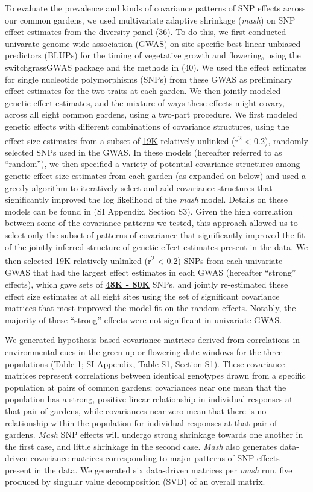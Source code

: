 \documentclass[
  9pt,
  twocolumn,
  twoside]{pnas-new}
\begin{document}
To evaluate the prevalence and kinds of covariance patterns of SNP
effects across our common gardens, we used multivariate adaptive
shrinkage (\emph{mash}) on SNP effect estimates from the diversity panel
(36). To do this, we first conducted univarate genome-wide association
(GWAS) on site-specific best linear unbiased predictors (BLUPs) for the
timing of vegetative growth and flowering, using the switchgrassGWAS
package and the methods in (40). We used the effect estimates for single
nucleotide polymorphisms (SNPs) from these GWAS as preliminary effect
estimates for the two traits at each garden. We then jointly modeled
genetic effect estimates, and the mixture of ways these effects might
covary, across all eight common gardens, using a two-part procedure. We
first modeled genetic effects with different combinations of covariance
structures, using the effect size estimates from a subset of \ul{19K}
relatively unlinked (r\textsuperscript{2} \textless{} 0.2), randomly
selected SNPs used in the GWAS. In these models (hereafter referred to
as ``random''), we then specified a variety of potential covariance
structures among genetic effect size estimates from each garden (as
expanded on below) and used a greedy algorithm to iteratively select and
add covariance structures that significantly improved the log likelihood
of the \emph{mash} model. Details on these models can be found in (SI
Appendix, Section S3). Given the high correlation between some of the
covariance patterns we tested, this approach allowed us to select only
the subset of patterns of covariance that significantly improved the fit
of the jointly inferred structure of genetic effect estimates present in
the data. We then selected 19K relatively unlinked (r\textsuperscript{2}
\textless{} 0.2) SNPs from each univariate GWAS that had the largest
effect estimates in each GWAS (hereafter ``strong'' effects), which gave
sets of \ul{\textbf{48K - 80K}} SNPs, and jointly re-estimated these
effect size estimates at all eight sites using the set of significant
covariance matrices that most improved the model fit on the random
effects. Notably, the majority of these ``strong'' effects were not
significant in univariate GWAS.

We generated hypothesis-based covariance matrices derived from
correlations in environmental cues in the green-up or flowering date
windows for the three populations (Table 1; SI Appendix, Table S1,
Section S1). These covariance matrices represent correlations between
identical genotypes drawn from a specific population at pairs of common
gardens; covariances near one mean that the population has a strong,
positive linear relationship in individual responses at that pair of
gardens, while covariances near zero mean that there is no relationship
within the population for individual responses at that pair of gardens.
\emph{Mash} SNP effects will undergo strong shrinkage towards one
another in the first case, and little shrinkage in the second case.
\emph{Mash} also generates data-driven covariance matrices corresponding
to major patterns of SNP effects present in the data. We generated six
data-driven matrices per \emph{mash} run, five produced by singular
value decomposition (SVD) of an overall matrix.
\end{document}

